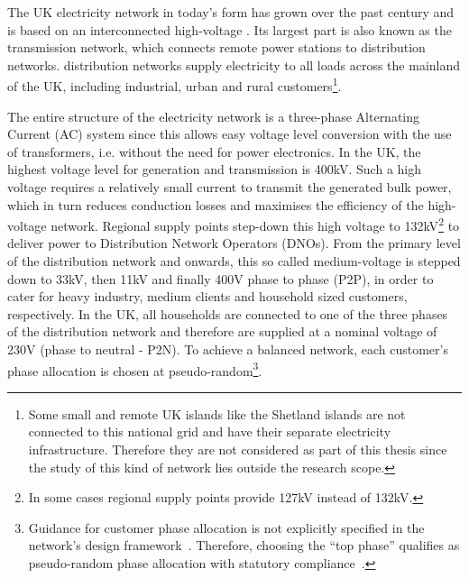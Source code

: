 The UK electricity network in today's form has grown over the past century and is based on an interconnected high-voltage .
Its largest part is also known as the transmission network, which connects remote power stations to distribution networks.
 distribution networks supply electricity to all loads across the mainland of the UK, including industrial, urban and rural customers\footnote{Some small and remote UK islands like the Shetland islands are not connected to this national grid and have their separate electricity infrastructure. Therefore they are not considered as part of this thesis since the study of this kind of network lies outside the research scope.}.

The entire structure of the electricity network is a three-phase Alternating Current (AC) system since this allows easy voltage level conversion with the use of transformers, i.e. without the need for power electronics.
In the UK, the highest voltage level for generation and transmission is 400kV.
Such a high voltage requires a relatively small current to transmit the generated bulk power, which in turn reduces conduction losses and maximises the efficiency of the high-voltage network.
Regional supply points step-down this high voltage to 132kV\footnote{In some cases regional supply points provide 127kV instead of 132kV.} to deliver power to Distribution Network Operators (DNOs).
From the primary level of the distribution network and onwards, this so called medium-voltage is stepped down to 33kV, then 11kV and finally 400V phase to phase (P2P), in order to cater for heavy industry, medium clients and household sized customers, respectively.
In the UK, all households are connected to one of the three phases of the distribution network and therefore are supplied at a nominal voltage of 230V (phase to neutral - P2N).
To achieve a balanced network, each customer's phase allocation is chosen at pseudo-random\footnote{Guidance for customer phase allocation is not explicitly specified in the network's design framework~\cite{UKPowerNetworks2014}. Therefore, choosing the ``top phase'' qualifies as pseudo-random phase allocation with statutory compliance~\cite{StatutoryInstruments2015}.}.


